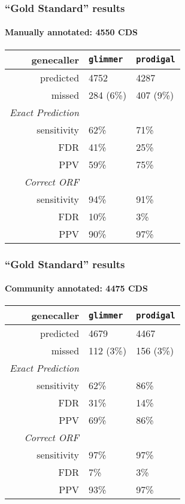 \begin{frame}
  \frametitle{``Gold Standard'' results}
  \framesubtitle{Manually annotated: 4550 CDS}
  \begin{center}
    \begin{tabular}{r|l|l}
	  genecaller & \texttt{glimmer} & \texttt{prodigal}  \\
	  \hline
	  predicted & 4752    & 4287  \\
	  missed & 284 (6\%)   & 407 (9\%)  \\
	  \hline
	  \emph{Exact Prediction} & & \\
  	  sensitivity   & 62\%   & 71\%  \\
  	  FDR   & 41\%   & 25\%  \\  
	  PPV   & 59\% & 75\%  \\  
	  \hline
	  \emph{Correct ORF} & & \\
  	  sensitivity   & 94\%   & 91\% \\
  	  FDR   & 10\%  & 3\% \\  
	  PPV   & 90\% & 97\%  \\  
    \end{tabular}
  \end{center}     
\end{frame}

\begin{frame}
  \frametitle{``Gold Standard'' results}
  \framesubtitle{Community annotated: 4475 CDS}
  \begin{center}
	\begin{tabular}{r|l|l}
	  genecaller & \texttt{glimmer} & \texttt{prodigal}  \\
	  \hline
	  predicted & 4679    & 4467  \\
	  missed & 112 (3\%)   & 156 (3\%)  \\
	  \hline
	  \emph{Exact Prediction} & & \\
  	  sensitivity   & 62\%   & 86\%  \\
  	  FDR   & 31\%   & 14\%  \\  
	  PPV   & 69\% & 86\%  \\  
	  \hline
	  \emph{Correct ORF} & & \\
  	  sensitivity   & 97\%   & 97\% \\
  	  FDR   & 7\%  & 3\% \\  
	  PPV   & 93\% & 97\%  \\  
	\end{tabular}
  \end{center}     
\end{frame}

